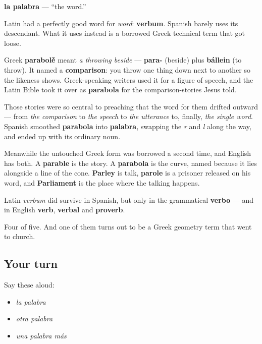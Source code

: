 \begin{cousinweb}
\textbf{la palabra} — \textquotedblleft{}the word.\textquotedblright{}

Latin had a perfectly good word for \emph{word}: \textbf{verbum}. Spanish barely uses its descendant. What it uses instead is a borrowed Greek technical term that got loose.

Greek \textbf{parabol\'{\={e}}} meant \emph{a throwing beside} — \textbf{para-} (beside) plus \textbf{bállein} (to throw). It named a \textbf{comparison}: you throw one thing down next to another so the likeness shows. Greek-speaking writers used it for a figure of speech, and the Latin Bible took it over as \textbf{parabola} for the comparison-stories Jesus told.

Those stories were so central to preaching that the word for them drifted outward — from \emph{the comparison} to \emph{the speech} to \emph{the utterance} to, finally, \emph{the single word}. Spanish smoothed \textbf{parabola} into \textbf{palabra}, swapping the \emph{r} and \emph{l} along the way, and ended up with its ordinary noun.

Meanwhile the untouched Greek form was borrowed a second time, and English has both. A \textbf{parable} is the story. A \textbf{parabola} is the curve, named because it lies alongside a line of the cone. \textbf{Parley} is talk, \textbf{parole} is a prisoner released on his word, and \textbf{Parliament} is the place where the talking happens.

Latin \emph{verbum} did survive in Spanish, but only in the grammatical \textbf{verbo} — and in English \textbf{verb}, \textbf{verbal} and \textbf{proverb}.
\end{cousinweb}

\begin{grammarlens}[title={What you've built}]
Four of five. And one of them turns out to be a Greek geometry term that went to church.
\end{grammarlens}

\subsection*{Your turn}
Say these aloud:

\begin{itemize}
\raggedright
  \item \emph{la palabra}
  \item \emph{otra palabra}
  \item \emph{una palabra más}
\end{itemize}

